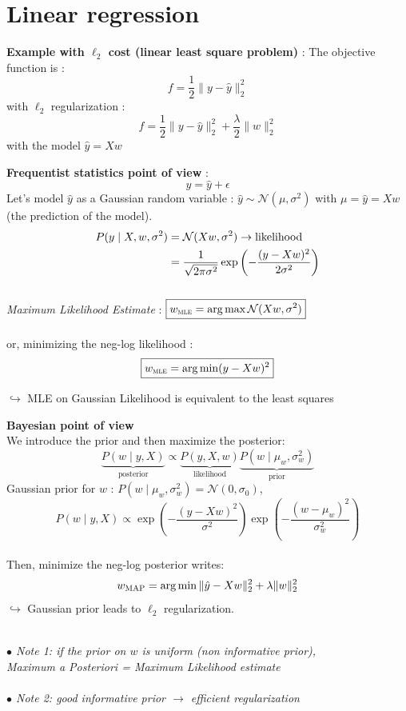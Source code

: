 \documentclass[10pt,xcolor=x11names,compress, show notes]{beamer}%
\newcommand{\N}{\mathcal{N}}
\begin{document}
\section{Linear regression}
\begin{frame}{\insertsectionhead}	
\textbf{Example with $\ell_2$ cost (linear least square problem) }:
\vfill
The objective function is : $$ f = \frac{1}{2}\| y-\hat{y}  \|^2_2$$
with $\ell_2$ regularization : $$ f = \frac{1}{2}\|y- \hat{y}  \|^2_2 + \frac{\lambda}{2}\|w\|^2_2$$ 
with the model $\hat{y}= Xw$
\end{frame}
\begin{frame}{\insertsectionhead}
\textbf{Frequentist statistics point of view} :
$$y = \hat{y} + \epsilon$$
Let's model $\hat{y}$ as a Gaussian random variable : $\hat{y} \sim \N(\mu,\sigma^2)$ with $\mu = \hat{y} = Xw$ (the prediction of the model). 
\begin{align}
P(y \mid X,w,\sigma^2)& = \N(Xw, \sigma^2) \hfill \rightarrow\text{likelihood}\\
&= \frac{1}{\sqrt{2\pi \sigma^2}}\exp\left(-\frac{(y-Xw)^2}{2 \sigma^2} \right)
\end{align}
~\\
\pause
 \textit{Maximum Likelihood Estimate} : $\boxed{w_{\text{\textsc{mle}}} = \arg\max \N(Xw, \sigma^2)}$\\~\\
 \pause
 or, minimizing the neg-log likelihood : 
 $$\boxed{w_{\text{\textsc{mle}}} = \arg\min (y - Xw)^2}$$
 
 $\hookrightarrow$ MLE on Gaussian Likelihood is equivalent to the least squares
\end{frame}

\begin{frame}{\insertsectionhead}
	\textbf{Bayesian point of view}\\
	We introduce the prior and then maximize the posterior:
	$$\underbrace{P(w \mid y,X)}_{\text{posterior}}\propto \underbrace{P(y,X,w)}_{\text{likelihood}}\underbrace{P(w \mid \mu_w,\sigma^2_{w})}_{\text{prior}}$$
	\pause
	Gaussian prior for $w$ : $P(w \mid \mu_w,\sigma^2_w) = \N(0,\sigma_0)$,
	$$P(w \mid y,X) \propto \exp\left(-\frac{(y-Xw)^2}{\sigma^2}	\right) \exp \left(-\frac{(w-\mu_w)^2}{\sigma^2_w} \right)$$
	\pause ~\\
	Then, minimize the neg-log posterior writes:
	$$w_{\text{\textsc{MAP}}} = \arg\min \| \hat{y}-Xw\|^2_2 + \lambda \|w\|^2_2$$
	$\hookrightarrow$ Gaussian prior leads to $\ell_2$ regularization.\\~\\

\begin{center}
\footnotesize
	\textit{$\bullet$ Note 1: if the prior on $w$ is uniform (non informative prior), \\
	Maximum a Posteriori =  Maximum Likelihood estimate}\\~\\
	
	\textit{$\bullet$ Note 2:  good informative prior $\rightarrow$  efficient regularization}
	\end{center}
\end{frame}
\end{document}
